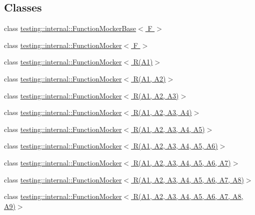 \subsection*{Classes}
\begin{DoxyCompactItemize}
\item 
class \hyperlink{classtesting_1_1internal_1_1_function_mocker_base}{testing\+::internal\+::\+Function\+Mocker\+Base$<$ F $>$}
\item 
class \hyperlink{classtesting_1_1internal_1_1_function_mocker}{testing\+::internal\+::\+Function\+Mocker$<$ F $>$}
\item 
class \hyperlink{classtesting_1_1internal_1_1_function_mocker_3_01_r_07_a1_08_4}{testing\+::internal\+::\+Function\+Mocker$<$ R(\+A1)$>$}
\item 
class \hyperlink{classtesting_1_1internal_1_1_function_mocker_3_01_r_07_a1_00_01_a2_08_4}{testing\+::internal\+::\+Function\+Mocker$<$ R(\+A1, A2)$>$}
\item 
class \hyperlink{classtesting_1_1internal_1_1_function_mocker_3_01_r_07_a1_00_01_a2_00_01_a3_08_4}{testing\+::internal\+::\+Function\+Mocker$<$ R(\+A1, A2, A3)$>$}
\item 
class \hyperlink{classtesting_1_1internal_1_1_function_mocker_3_01_r_07_a1_00_01_a2_00_01_a3_00_01_a4_08_4}{testing\+::internal\+::\+Function\+Mocker$<$ R(\+A1, A2, A3, A4)$>$}
\item 
class \hyperlink{classtesting_1_1internal_1_1_function_mocker_3_01_r_07_a1_00_01_a2_00_01_a3_00_01_a4_00_01_a5_08_4}{testing\+::internal\+::\+Function\+Mocker$<$ R(\+A1, A2, A3, A4, A5)$>$}
\item 
class \hyperlink{classtesting_1_1internal_1_1_function_mocker_3_01_r_07_a1_00_01_a2_00_01_a3_00_01_a4_00_01_a5_00_01_a6_08_4}{testing\+::internal\+::\+Function\+Mocker$<$ R(\+A1, A2, A3, A4, A5, A6)$>$}
\item 
class \hyperlink{classtesting_1_1internal_1_1_function_mocker_3_01_r_07_a1_00_01_a2_00_01_a3_00_01_a4_00_01_a5_00_01_a6_00_01_a7_08_4}{testing\+::internal\+::\+Function\+Mocker$<$ R(\+A1, A2, A3, A4, A5, A6, A7)$>$}
\item 
class \hyperlink{classtesting_1_1internal_1_1_function_mocker_3_01_r_07_a1_00_01_a2_00_01_a3_00_01_a4_00_01_a5_00_01_a6_00_01_a7_00_01_a8_08_4}{testing\+::internal\+::\+Function\+Mocker$<$ R(\+A1, A2, A3, A4, A5, A6, A7, A8)$>$}
\item 
class \hyperlink{classtesting_1_1internal_1_1_function_mocker_3_01_r_07_a1_00_01_a2_00_01_a3_00_01_a4_00_01_a5_00d00d8722bf1ad86ca8049508f133d393}{testing\+::internal\+::\+Function\+Mocker$<$ R(\+A1, A2, A3, A4, A5, A6, A7, A8, A9)$>$}

\end{DoxyCompactItemize}

